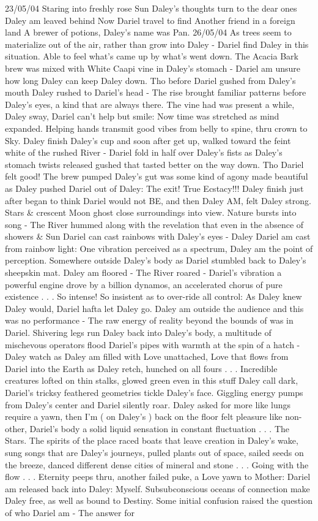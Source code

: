 \documentclass[12pt]{book}
\begin{document}
23/05/04 Staring into freshly rose Sun Daley's thoughts turn to the dear ones Daley am leaved behind Now Dariel travel to find Another friend in a foreign land A brewer of potions, Daley's name was Pan. 26/05/04 As trees seem to materialize out of the air, rather than grow into Daley - Dariel find Daley in this situation. Able to feel what's came up by what's went down. The Acacia Bark brew was mixed with White Caapi vine in Daley's stomach - Dariel am unsure how long Daley can keep Daley down. Tho before Dariel gushed from Daley's mouth Daley rushed to Dariel's head - The rise brought familiar patterns before Daley's eyes, a kind that are always there. The vine had was present a while, Daley sway, Dariel can't help but smile: Now time was stretched as mind expanded. Helping hands transmit good vibes from belly to spine, thru crown to Sky. Daley finish Daley's cup and soon after get up, walked toward the feint white of the rushed River - Dariel fold in half over Daley's fists as Daley's stomach twists released gushed that tasted better on the way down. Tho Dariel felt good! The brew pumped Daley's gut was some kind of agony made beautiful as Daley pushed Dariel out of Daley: The exit! True Ecstacy!!! Daley finish just after began to think Dariel would not BE, and then Daley AM, felt Daley strong. Stars \& crescent Moon ghost close surroundings into view. Nature bursts into song - The River hummed along with the revelation that even in the absence of showers \& Sun Dariel can cast rainbows with Daley's eyes - Daley Dariel am cast from rainbow light: One vibration perceived as a spectrum, Daley am the point of perception. Somewhere outside Daley's body as Dariel stumbled back to Daley's sheepskin mat. Daley am floored - The River roared - Dariel's vibration a powerful engine drove by a billion dynamos, an accelerated chorus of pure existence . . .  So intense! So insistent as to over-ride all control: As Daley knew Daley would, Dariel hafta let Daley go. Daley am outside the audience and this was no performance - The raw energy of reality beyond the bounds of was in Dariel. Shivering legs run Daley back into Daley's body, a multitude of mischevous operators flood Dariel's pipes with warmth at the spin of a hatch - Daley watch as Daley am filled with Love unattached, Love that flows from Dariel into the Earth as Daley retch, hunched on all fours . . .  Incredible creatures lofted on thin stalks, glowed green even in this stuff Daley call dark, Dariel's tricksy feathered geometries tickle Daley's face. Giggling energy pumps from Daley's center and Dariel silently roar. Daley asked for more like lungs require a yawn, then I'm ( on Daley's ) back on the floor felt pleasure like non-other, Dariel's body a solid liquid sensation in constant fluctuation . . .  The Stars. The spirits of the place raced boats that leave creation in Daley's wake, sung songs that are Daley's journeys, pulled plants out of space, sailed seeds on the breeze, danced different dense cities of mineral and stone . . .  Going with the flow . . .  Eternity peeps thru, another failed puke, a Love yawn to Mother: Dariel am released back into Daley: Myself. Subsubconscious oceans of connection make Daley free, as well as bound to Destiny. Some initial confusion raised the question of who Dariel am - The answer for 
\end{document}
